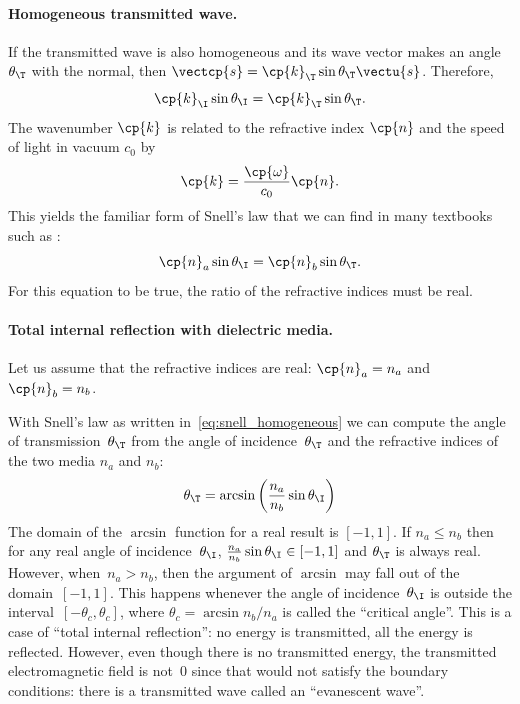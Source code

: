 \begin{refsection}
\paragraph{Homogeneous transmitted wave.}
If the transmitted wave is also homogeneous and its wave vector makes an angle $\theta_\T$ with the normal, then $\vectcp{s} = \cp{k}_\T \sin \theta_\T \vectu{s}$.
Therefore,
\begin{equation}
    \cp{k}_\I \sin \theta_\I = \cp{k}_\T \sin \theta_\T
    \text{.}
\end{equation}
The wavenumber $\cp{k}$ is related
to the refractive index $\cp{n}$
and the speed of light in vacuum $c_0$ by
\begin{equation}
    \cp{k} = \frac{\cp{\omega}}{c_0} \cp{n}
    \text{.}
\end{equation}
This yields the familiar form of Snell's law that we can find in many textbooks such as \textcite{hecht2002optics}:
\begin{equation}
    \cp{n}_a \sin \theta_\I = \cp{n}_b \sin \theta_\T
    \text{.}
    \label{eq:snell_homogeneous}
\end{equation}
For this equation to be true, the ratio of the refractive indices must be real.

\paragraph{Total internal reflection with dielectric media.}
Let us assume that the refractive indices are real: $\cp{n}_a = n_a$ and $\cp{n}_b = n_b$.

With Snell's law as written in~\cref{eq:snell_homogeneous} we can compute the angle of transmission~$\theta_\T$ from the angle of incidence~$\theta_\T$ and the refractive indices of the two media $n_a$ and $n_b$:
\begin{equation}
    \theta_\T = \arcsin
    \left(
        \frac{n_a}{n_b} \sin \theta_\I
    \right)
\end{equation}
The domain of the $\arcsin$ function for a real result is $[-1, 1]$.
If $n_a \leq n_b$ then for any real angle of incidence~$\theta_\I$, $\frac{n_a}{n_b} \sin \theta_\I \in [-1, 1]$ and $\theta_\T$ is always real.
However, when~$n_a > n_b$, then the argument of $\arcsin$ may fall out of the domain~$[-1,1]$.
This happens whenever the angle of incidence~$\theta_\I$ is outside the interval~$[-\theta_c, \theta_c]$, where $\theta_c = \arcsin{n_b / n_a}$ is called the ``critical angle''.
This is a case of ``total internal reflection'': no energy is transmitted, all the energy is reflected.
However, even though there is no transmitted energy, the transmitted electromagnetic field is not~0 since that would not satisfy the boundary conditions:
there is a transmitted wave called an ``evanescent wave''.


\end{refsection}

